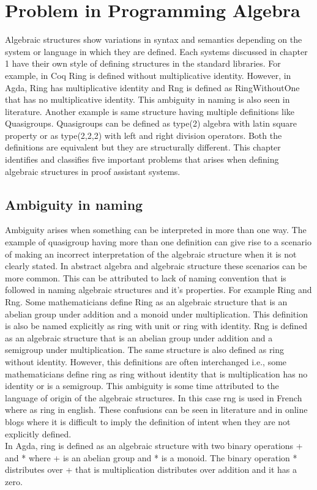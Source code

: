 \chapter{Problem in Programming Algebra}

Algebraic structures show variations in syntax and semantics depending on the
system or language in which they are defined. Each systems discussed in chapter
1 have their own style of defining structures in the standard libraries. For
example, in Coq Ring is defined without multiplicative identity. However, in
Agda, Ring has multiplicative identity and Rng is defined as RingWithoutOne that
has no multiplicative identity. This ambiguity in naming is also seen in
literature. Another example is same structure having multiple definitions like
Quasigroups. Quasigroups can be defined as type(2) algebra with latin square
property or as type(2,2,2) with left and right division operators. Both the
definitions are equivalent but they are structurally different. This chapter
identifies and classifies five important problems that arises when defining
algebraic structures in proof assistant systems. 

\section{Ambiguity in naming}
Ambiguity arises when something can be interpreted in more than one way. The
example of quasigroup having more than one definition can give rise to a
scenario of making an incorrect interpretation of the algebraic structure when
it is not clearly stated. In abstract algebra and algebraic structure these
scenarios can be more common. This can be attributed to lack of naming
convention that is followed in naming algebraic structures and it's properties.
For example Ring and Rng. Some mathematicians define Ring as an algebraic
structure that is an abelian group under addition and a monoid under
multiplication. This definition is also be named explicitly as ring with unit or
ring with identity. Rng is defined as an algebraic structure that is an abelian
group under addition and a semigroup under multiplication. The same structure is
also defined as ring without identity. However, this definitions are often
interchanged i.e., some mathematicians define ring as ring without identity that
is multiplication has no identity or is a semigroup. This ambiguity is some time
attributed to the language of origin of the algebraic structures. In this case
rng is used in French where as ring in english. These confusions can be seen in
literature and in online blogs where it is difficult to imply the definition of
intent when they are not explicitly defined. \\
In Agda, ring is defined as an algebraic structure with two binary operations +
and * where + is an abelian group and * is a monoid. The binary operation *
distributes over + that is multiplication distributes over addition and it has a
zero.\\

